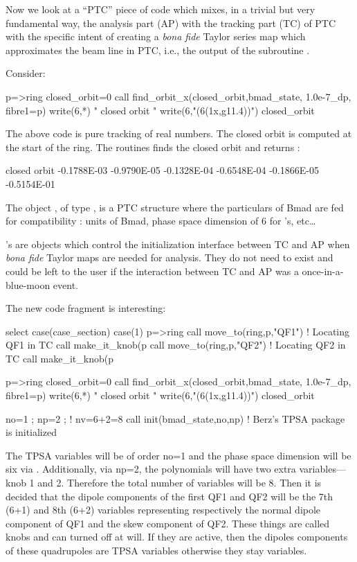\documentclass{hitec}     %
\begin{document}
{{Now we look at  a ``PTC'' piece of code which mixes, in a trivial  but very fundamental way, the analysis part (AP) with the tracking part (TC) of PTC with the specific intent of creating a {\it bona fide} Taylor series map which approximates the beam line in PTC, i.e., the output of the  subroutine  .  

Consider:

\begin{code}
p=>ring%
closed_orbit=0
call find_orbit_x(closed_orbit,bmad_state, 1.0e-7_dp, fibre1=p)
write(6,*) " closed orbit "
write(6,"(6(1x,g11.4))") closed_orbit
\end{code}

The above code is pure tracking of real numbers. The closed orbit is   computed at the start of the ring. The  routines finds the closed orbit and  returns :
\begin{code}
  closed orbit
 -0.1788E-03 -0.9790E-05 -0.1328E-04 -0.6548E-04 -0.1866E-05 -0.5154E-01
 \end{code}
 
 The object , of type , is a PTC structure where the particulars of Bmad are fed for compatibility : units of Bmad, phase space dimension of 6 for 's,  etc\ldots 
 
  's are objects which   control the initialization  interface between TC and AP when {\it bona fide} Taylor maps are needed for analysis. They do not need to exist and could be left to the user if the interaction between TC and AP was a once-in-a-blue-moon event.
 
 The new code fragment is interesting:
\begin{code}
select case(case_section)
case(1)
p=>ring%
call move_to(ring,p,"QF1")   !  Locating QF1 in TC
call make_it_knob(p%
call move_to(ring,p,"QF2")   !  Locating QF2 in TC
call make_it_knob(p%

p=>ring%
closed_orbit=0
call find_orbit_x(closed_orbit,bmad_state, 1.0e-7_dp, fibre1=p)
write(6,*) " closed orbit "
write(6,"(6(1x,g11.4))") closed_orbit
 
no=1 ; np=2 ;  ! nv=6+2=8
call init(bmad_state,no,np)   ! Berz's TPSA package is initialized
\end{code}



The TPSA variables will be of order no=1 and the phase space dimension will be six via .
Additionally, via np=2, the polynomials will have two extra variables---knob 1 and 2. Therefore the total number of variables will be 8.
Then it is decided that the dipole components of the first QF1 and QF2 will be the 7th (6+1) and 8th (6+2) variables representing
respectively the  normal dipole component of QF1 and the skew component of QF2. These things are called knobs and can turned off at will.
If they are active, then the dipoles components of these quadrupoles are TPSA variables otherwise they stay  variables.

}}
\end{document}
